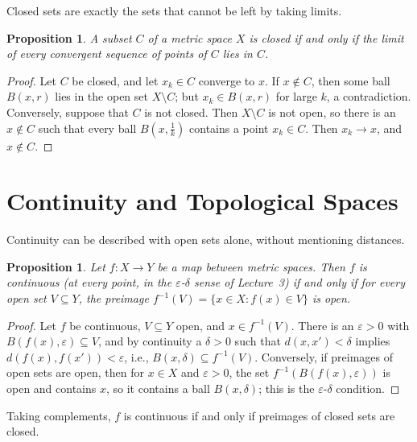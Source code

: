 \documentclass[11pt]{article}
\theoremstyle{definition}
\theoremstyle{plain}
\newtheorem{proposition}[definition]{Proposition}
\theoremstyle{remark}
\begin{document}
Closed sets are exactly the sets that cannot be left by taking limits.

\begin{proposition}\label{prop:closed-limits}
    A subset $C$ of a metric space $X$ is closed if and only if the limit of every convergent sequence of points of $C$ lies in $C$.
\end{proposition}

\begin{proof}
    Let $C$ be closed, and let $x_k \in C$ converge to $x$. If $x \notin C$, then some ball $B(x, r)$ lies in the open set $X \setminus C$; but $x_k \in B(x, r)$ for large $k$, a contradiction. Conversely, suppose that $C$ is not closed. Then $X \setminus C$ is not open, so there is an $x \notin C$ such that every ball $B(x, \frac{1}{k})$ contains a point $x_k \in C$. Then $x_k \to x$, and $x \notin C$.
\end{proof}

\section{Continuity and Topological Spaces}\label{sec:continuity}

Continuity can be described with open sets alone, without mentioning distances.

\begin{proposition}\label{prop:continuity-open}
    Let $f: X \to Y$ be a map between metric spaces. Then $f$ is continuous (at every point, in the $\varepsilon$-$\delta$ sense of Lecture~3) if and only if for every open set $V \subseteq Y$, the preimage $f^{-1}(V) = \{x \in X : f(x) \in V\}$ is open.
\end{proposition}

\begin{proof}
    Let $f$ be continuous, $V \subseteq Y$ open, and $x \in f^{-1}(V)$. There is an $\varepsilon > 0$ with $B(f(x), \varepsilon) \subseteq V$, and by continuity a $\delta > 0$ such that $d(x, x') < \delta$ implies $d(f(x), f(x')) < \varepsilon$, i.e., $B(x, \delta) \subseteq f^{-1}(V)$. Conversely, if preimages of open sets are open, then for $x \in X$ and $\varepsilon > 0$, the set $f^{-1}(B(f(x), \varepsilon))$ is open and contains $x$, so it contains a ball $B(x, \delta)$; this is the $\varepsilon$-$\delta$ condition.
\end{proof}

Taking complements, $f$ is continuous if and only if preimages of closed sets are closed.
\end{document}
